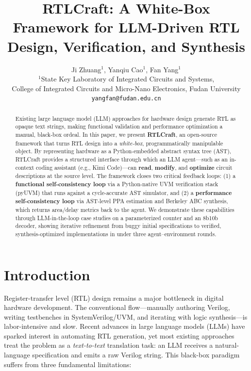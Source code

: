 \documentclass[11pt]{article}
\title{\textbf{RTLCraft: A White-Box Framework for LLM-Driven RTL Design, Verification, and Synthesis}}
\author{
Ji Zhuang$^{1}$, Yanqiu Cao$^{1}$, Fan Yang$^{1}$ \\
\small $^{1}$State Key Laboratory of Integrated Circuits and Systems, \\
\small College of Integrated Circuits and Micro-Nano Electronics, Fudan University \\
\small \texttt{yangfan@fudan.edu.cn}
}
\date{}
\begin{document}
\maketitle

\begin{abstract}
Existing large language model (LLM) approaches for hardware design generate RTL as opaque text strings, making functional validation and performance optimization a manual, black-box ordeal. In this paper, we present \textbf{RTLCraft}, an open-source framework that turns RTL design into a \textit{white-box}, programmatically manipulable object. By representing hardware as a Python-embedded abstract syntax tree (AST), RTLCraft provides a structured interface through which an LLM agent---such as an in-context coding assistant (e.g., Kimi Code)---can \textbf{read}, \textbf{modify}, and \textbf{optimize} circuit descriptions at the source level. The framework closes two critical feedback loops: (1) a \textbf{functional self-consistency loop} via a Python-native UVM verification stack (pyUVM) that runs against a cycle-accurate AST simulator, and (2) a \textbf{performance self-consistency loop} via AST-level PPA estimation and Berkeley ABC synthesis, which returns area/delay metrics back to the agent. We demonstrate these capabilities through LLM-in-the-loop case studies on a parameterized counter and an 8b10b decoder, showing iterative refinement from buggy initial specifications to verified, synthesis-optimized implementations in under three agent--environment rounds.
\end{abstract}

\section{Introduction}
\label{sec:intro}

Register-transfer level (RTL) design remains a major bottleneck in digital hardware development. The conventional flow---manually authoring Verilog, writing testbenches in SystemVerilog/UVM, and iterating with logic synthesis---is labor-intensive and slow. Recent advances in large language models (LLMs) have sparked interest in automating RTL generation, yet most existing approaches treat the problem as a \textit{text-to-text} translation task: an LLM receives a natural-language specification and emits a raw Verilog string. This black-box paradigm suffers from three fundamental limitations:
\end{document}

